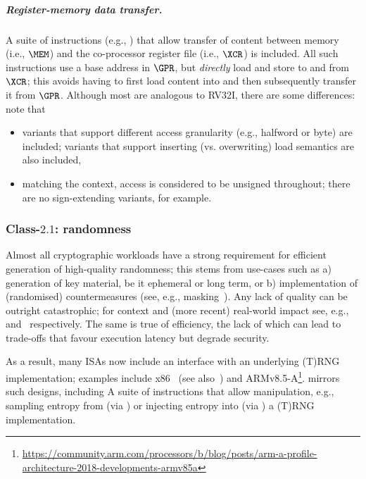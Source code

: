 \subparagraph{Register-memory   data transfer.}

A suite of instructions 
(e.g., )
that allow 
transfer of content between
   memory                         (i.e., $\MEM$)
and
the    co-processor register file (i.e., $\XCR$)
is included.
All such instructions use a base address in $\GPR$, but {\em directly} load 
and store to and from $\XCR$; this avoids having to first load content into 
and then subsequently transfer it from $\GPR$.
Although most are analogous to RV32I, there are some differences: note that

\begin{itemize}
\item variants that support different access granularity (e.g., halfword or
      byte) are included; variants that support inserting (vs. overwriting)
      load semantics are also included,
\item matching the context, access is considered to be unsigned throughout;
      there are no sign-extending variants, for example.
\end{itemize}


\subsubsection{Class-$2.1$: randomness}
\label{sec:bg:feature:2:1}

Almost all cryptographic workloads have a strong requirement for efficient
generation of high-quality randomness; this stems from use-cases such as
a) generation of key material, be it ephemeral or long term,
   or
b) implementation of (randomised) countermeasures
   (see, e.g., masking~\cite[Chapter 9]{SCARV:ManOswPop:07}).
Any lack of quality can be outright catastrophic;
for context and (more recent) real-world impact see, e.g.,~\cite{SCARV:KSWH:98,SCARV:RFC:4086} and~\cite{SCARV:NSSKM:17} respectively.
The same is true of efficiency, the lack of which can lead to trade-offs 
that favour execution latency but degrade security.

As a result, many ISAs now include an interface with an underlying (T)RNG
implementation; examples include
x86~\cite[Section 7.3.17.1 and 7.3.17.2]{SCARV:X86:2:18} 
(see also~\cite{SCARV:JunKoc:99,SCARV:HamKocMar:12})
and
ARMv8.5-A\footnote{
\url{https://community.arm.com/processors/b/blog/posts/arm-a-profile-architecture-2018-developments-armv85a}
}.  \XCID mirrors such designs, including
A suite of instructions 
that allow 
manipulation, e.g.,
 sampling entropy from (via )
or
injecting entropy into (via )
a (T)RNG implementation.

